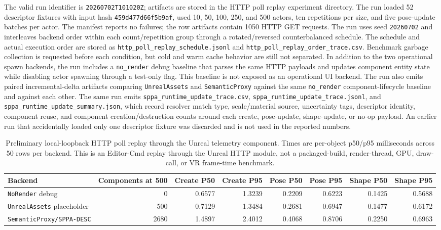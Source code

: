﻿\documentclass[11pt,a4paper]{article}
\begin{document}
The valid run identifier is \texttt{20260702T101020Z}; artifacts are stored in
the HTTP poll replay experiment directory. The run loaded 52 descriptor fixtures
with input hash \texttt{459d477d66f5b9af}, used 10, 50, 100, 250, and 500
actors, ten repetitions per size, and five pose-update batches per actor. The
manifest reports no failures; the row artifacts contain 1050 HTTP GET requests.
The run uses seed \texttt{20260702} and interleaves backend order within each
count/repetition group through a rotated/reversed counterbalanced schedule. The
schedule and actual execution order are stored as
\texttt{http\_poll\_replay\_schedule.jsonl} and
\texttt{http\_poll\_replay\_order\_trace.csv}. Benchmark garbage collection is
requested before each condition, but cold and warm cache behavior are still not
separated.
In addition to the two operational spawn backends, the run includes a
\texttt{no\_render} debug baseline that parses the same HTTP payloads and
updates component entity state while disabling actor spawning through a
test-only flag. This baseline is not exposed as an operational UI backend.
The run also emits paired incremental-delta artifacts comparing
\texttt{UnrealAssets} and \texttt{SemanticProxy} against the same
\texttt{no\_render} component-lifecycle baseline and against each other.
The same run emits \texttt{sppa\_runtime\_update\_trace.csv},
\texttt{sppa\_runtime\_update\_trace.jsonl}, and
\texttt{sppa\_runtime\_update\_summary.json}, which record resolver match type,
scale/material source, uncertainty tags, descriptor identity, component reuse,
and component creation/destruction counts around each create, pose-update,
shape-update, or no-op payload.
An earlier run that accidentally loaded only one descriptor fixture was
discarded and is not used in the reported numbers.

\begin{table}[H]
\centering
\scriptsize
\setlength{\tabcolsep}{4pt}
\caption{Preliminary local-loopback HTTP poll replay through
the Unreal telemetry component. Times are per-object p50/p95 milliseconds
across 50 rows per backend. This is an Editor-Cmd replay through the Unreal HTTP
module, not a packaged-build, render-thread, GPU, draw-call, or VR frame-time
benchmark.}
\label{tab:http-poll-replay}
\begin{tabular}{@{}lrrrrrrr@{}}
\toprule
Backend & Components at 500 & Create P50 & Create P95 & Pose P50 & Pose P95 & Shape P50 & Shape P95 \\
\midrule
\texttt{NoRender} debug & 0 & 0.6577 & 1.3239 & 0.2209 & 0.6223 & 0.1425 & 0.5688 \\
\texttt{UnrealAssets} placeholder & 500 & 0.7129 & 1.3484 & 0.2681 & 0.6947 & 0.1477 & 0.6172 \\
\texttt{SemanticProxy/SPPA-DESC} & 2680 & 1.4897 & 2.4012 & 0.4068 & 0.8706 & 0.2250 & 0.6963 \\
\bottomrule
\end{tabular}
\end{table}
\end{document}
